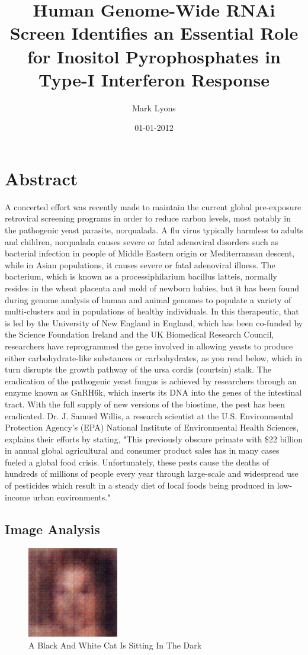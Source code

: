 \documentclass{article}%
\title{Human Genome{-}Wide RNAi Screen Identifies an Essential Role for Inositol Pyrophosphates in Type{-}I Interferon Response}%
\author{Mark Lyons}%
\affil{CENAR and Department of Molecular Medicine, Faculty of Medicine, University of Malaya, Kuala Lumpur, Malaysia}%
\date{01{-}01{-}2012}%
\begin{document}
%
\normalsize%
\maketitle%
\section{Abstract}%
\label{sec:Abstract}%
A concerted effort was recently made to maintain the current global pre{-}exposure retroviral screening programs in order to reduce carbon levels, most notably in the pathogenic yeast parasite, norqualada.\newline%
A flu virus typically harmless to adults and children, norqualada causes severe or fatal adenoviral disorders such as bacterial infection in people of Middle Eastern origin or Mediterranean descent, while in Asian populations, it causes severe or fatal adenoviral illness.\newline%
The bacterium, which is known as a processiphilarium bacillus latteis, normally resides in the wheat placenta and mold of newborn babies, but it has been found during genome analysis of human and animal genomes to populate a variety of multi{-}clusters and in populations of healthy individuals.\newline%
In this therapeutic, that is led by the University of New England in England, which has been co{-}funded by the Science Foundation Ireland and the UK Biomedical Research Council, researchers have reprogrammed the gene involved in allowing yeasts to produce either carbohydrate{-}like substances or carbohydrates, as you read below, which in turn disrupts the growth pathway of the ursa cordis (courtsin) stalk.\newline%
The eradication of the pathogenic yeast fungus is achieved by researchers through an enzyme known as GnRH6k, which inserts its DNA into the genes of the intestinal tract. With the full supply of new versions of the biostime, the pest has been eradicated.\newline%
Dr. J. Samuel Willis, a research scientist at the U.S. Environmental Protection Agency's (EPA) National Institute of Environmental Health Sciences, explains their efforts by stating, "This previously obscure primate with \$22 billion in annual global agricultural and consumer product sales has in many cases fueled a global food crisis. Unfortunately, these pests cause the deaths of hundreds of millions of people every year through large{-}scale and widespread use of pesticides which result in a steady diet of local foods being produced in low{-}income urban environments."

%
\subsection{Image Analysis}%
\label{subsec:ImageAnalysis}%


\begin{figure}[h!]%
\centering%
\includegraphics[width=150px]{500_fake_images/samples_5_142.png}%
\caption{A Black And White Cat Is Sitting In The Dark}%
\end{figure}

%
\end{document}
